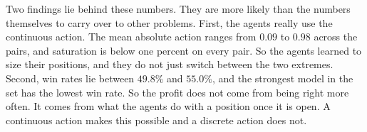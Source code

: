 Two findings lie behind these numbers. They are more likely than the numbers themselves to carry over to other problems. First, the agents really use the continuous action. The mean absolute action ranges from $0.09$ to $0.98$ across the pairs, and saturation is below one percent on every pair. So the agents learned to size their positions, and they do not just switch between the two extremes. Second, win rates lie between $49.8\%$ and $55.0\%$, and the strongest model in the set has the lowest win rate. So the profit does not come from being right more often. It comes from what the agents do with a position once it is open. A continuous action makes this possible and a discrete action does not.